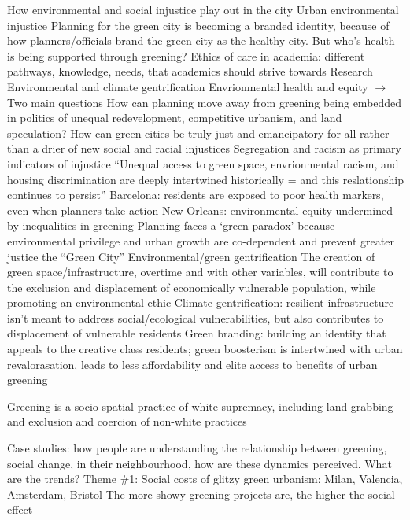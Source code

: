 \documentclass{article}
\newcommand{\alignedmarginpar}[1]{%
        \marginpar{\raggedright\small #1}
    }
\begin{document}
\begin{outline}
	\1 How environmental and social injustice play out in the city
	\1 Urban environmental injustice
	\1 Planning for the green city is becoming a branded identity, because of how planners/officials brand the green city as the healthy city. But who's health is being supported through greening?
	\1 Ethics of care in academia: different pathways, knowledge, needs, that academics should strive towards
	\1 Research  
		\2 Environmental and climate gentrification
		\2 Envrionmental health and equity
	 	\2 $\rightarrow$ Two main questions	
			\3 How can planning move away from greening being embedded in politics of unequal redevelopment, competitive urbanism, and land speculation?
			\3 How can green cities be truly just and emancipatory for all rather than a drier of new social and racial injustices
	\1 Segregation and racism as primary indicators of injustice 
		\2 ``Unequal access to green space, envrionmental racism, and housing discrimination are deeply intertwined historically = and this reslationship continues to persist''
		\2 Barcelona: residents are exposed to poor health markers, even when planners take action
		\2 New Orleans: environmental equity undermined by inequalities in greening
	\1 Planning faces a `green paradox' because environmental privilege and urban growth are co-dependent and prevent greater justice the ``Green City''
	\1 Environmental/green gentrification
		\2 The creation of green space/infrastructure, overtime and with other variables, will contribute to the exclusion and displacement of economically vulnerable population, while promoting an environmental ethic
		\2 Climate gentrification: resilient infrastructure isn't meant to address social/ecological vulnerabilities, but also contributes to displacement of vulnerable residents
	\1 Green branding: building an identity that appeals to the creative class residents; green boosterism is intertwined with urban revalorasation, leads to less affordability and elite access to benefits of urban greening\alignedmarginpar{Exclusive spaces}
	\1 Greening is a socio-spatial practice of white supremacy, including land grabbing and exclusion and coercion of non-white practices\alignedmarginpar{Non diverse uses}
	\1 Case studies: how people are understanding the relationship between greening, social change, in their neighbourhood, how are these dynamics perceived. What are the trends?
	\1 Theme \#1: Social costs of glitzy green urbanism: Milan, Valencia, Amsterdam, Bristol
		\2 The more showy greening projects are, the higher the social effect

\end{outline}
\end{document}
